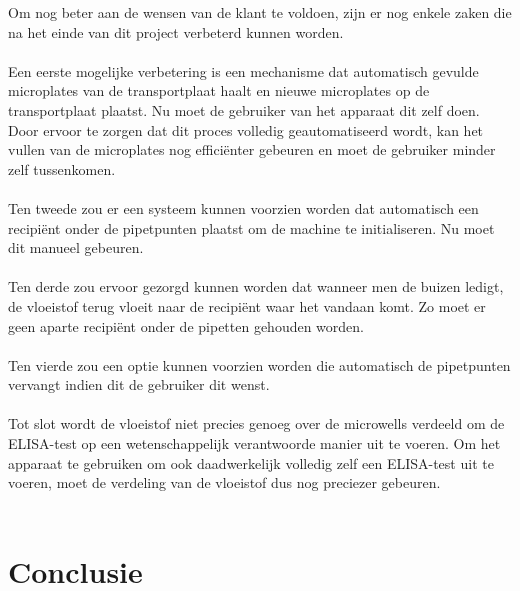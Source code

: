 \documentclass[a4paper,twoside,kulak]{kulakreport} %
\begin{document}
Om nog beter aan de wensen van de klant te voldoen, zijn er nog enkele zaken die na het einde van dit project verbeterd kunnen worden. \\ \\
Een eerste mogelijke verbetering is een mechanisme dat automatisch gevulde microplates  van de transportplaat haalt en nieuwe microplates op de transportplaat plaatst. Nu moet de gebruiker van het apparaat dit zelf doen. Door ervoor te zorgen dat dit proces volledig geautomatiseerd wordt, kan het vullen van de microplates nog efficiënter gebeuren en moet de gebruiker minder zelf tussenkomen. \\ \\
Ten tweede zou er een systeem kunnen voorzien worden dat automatisch een recipiënt onder de pipetpunten plaatst om de machine te initialiseren. Nu moet dit manueel gebeuren. \\ \\
Ten derde zou ervoor gezorgd kunnen worden dat wanneer men de buizen ledigt, de vloeistof terug vloeit naar de recipiënt waar het vandaan komt. Zo moet er geen aparte recipiënt onder de pipetten gehouden worden. \\ \\
Ten vierde zou een optie kunnen voorzien worden die automatisch de pipetpunten vervangt indien dit de gebruiker dit wenst. \\ \\
Tot slot wordt de vloeistof niet precies genoeg over de microwells verdeeld om de ELISA-test op een wetenschappelijk verantwoorde manier uit te voeren. Om het apparaat te gebruiken om ook daadwerkelijk volledig zelf een ELISA-test uit te voeren, moet de verdeling van de vloeistof dus nog preciezer gebeuren. 
\\ \\


\chapter{Conclusie}
\end{document}
